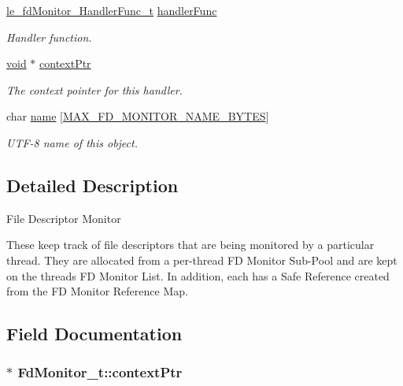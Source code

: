 \begin{DoxyCompactItemize}
\hyperlink{le__fd_monitor_8h_ac2d5531f6fae37076c9a79682091a161}{le\+\_\+fd\+Monitor\+\_\+\+Handler\+Func\+\_\+t} \hyperlink{struct_fd_monitor__t_ae26ea9df90494512110b00f1c42dacba}{handler\+Func}
\begin{DoxyCompactList}\small\item\em Handler function. \end{DoxyCompactList}\item 
\hyperlink{_t_e_m_p_l_a_t_e__cdef_8h_ac9c84fa68bbad002983e35ce3663c686}{void} $\ast$ \hyperlink{struct_fd_monitor__t_ad7864b727eb4ad78229fda59ac5c7695}{context\+Ptr}
\begin{DoxyCompactList}\small\item\em The context pointer for this handler. \end{DoxyCompactList}\item 
char \hyperlink{struct_fd_monitor__t_a625d32b179f538af9be84b15f969f3aa}{name} \mbox{[}\hyperlink{fd_monitor_8c_afade2d1c034a300007e1435974a6a0c6}{M\+A\+X\+\_\+\+F\+D\+\_\+\+M\+O\+N\+I\+T\+O\+R\+\_\+\+N\+A\+M\+E\+\_\+\+B\+Y\+T\+ES}\mbox{]}
\begin{DoxyCompactList}\small\item\em U\+T\+F-\/8 name of this object. \end{DoxyCompactList}\end{DoxyCompactItemize}


\subsection{Detailed Description}
File Descriptor Monitor

These keep track of file descriptors that are being monitored by a particular thread. They are allocated from a per-\/thread FD Monitor Sub-\/\+Pool and are kept on the thread\textquotesingle{}s FD Monitor List. In addition, each has a Safe Reference created from the FD Monitor Reference Map. 

\subsection{Field Documentation}
\subsubsection[{\texorpdfstring{context\+Ptr}{contextPtr}}]{$\ast$ Fd\+Monitor\+\_\+t\+::context\+Ptr}\hypertarget{struct_fd_monitor__t_ad7864b727eb4ad78229fda59ac5c7695}{}\label{struct_fd_monitor__t_ad7864b727eb4ad78229fda59ac5c7695}


